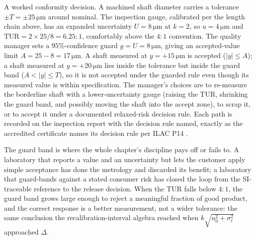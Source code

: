 A worked conformity decision. A machined shaft diameter carries a
tolerance $\pm T = \pm 25\,\si{\micro\meter}$ around nominal. The
inspection gauge, calibrated per the length chain above, has an
expanded uncertainty $U = 8\,\si{\micro\meter}$ at $k = 2$, so
$u = 4\,\si{\micro\meter}$ and $\mathrm{TUR} = 2 \times 25 / 8 =
6.25{:}1$, comfortably above the $4{:}1$ convention. The quality
manager sets a $95\%$-confidence guard $g = U = 8\,\si{\micro\meter}$,
giving an accepted-value limit $A = 25 - 8 = 17\,\si{\micro\meter}$.
A shaft measured at $y = +15\,\si{\micro\meter}$ is accepted
($|y| \leq A$); a shaft measured at $y = +20\,\si{\micro\meter}$
lies inside the tolerance but inside the guard band ($A < |y| \leq
T$), so it is not accepted under the guarded rule even though its
measured value is within specification. The manager's choices are to
re-measure the borderline shaft with a lower-uncertainty gauge
(raising the TUR, shrinking the guard band, and possibly moving the
shaft into the accept zone), to scrap it, or to accept it under a
documented relaxed-risk decision rule. Each path is recorded on the
inspection report with the decision rule named, exactly as the
accredited certificate names its decision rule per ILAC
P14 \cite{std:ch03t3b-ilac-p14}.

The guard band is where the whole chapter's discipline pays off or
fails to. A laboratory that reports a value and an uncertainty but
lets the customer apply simple acceptance has done the metrology and
discarded its benefit; a laboratory that guard-bands against a
stated consumer risk has closed the loop from the SI-traceable
reference to the release decision. When the TUR falls below $4{:}1$,
the guard band grows large enough to reject a meaningful fraction of
good product, and the correct response is a better measurement, not
a wider tolerance: the same conclusion the recalibration-interval
algebra reached when $k\sqrt{u_{0}^{2} + \sigma_{r}^{2}}$ approached
$\Delta$.

